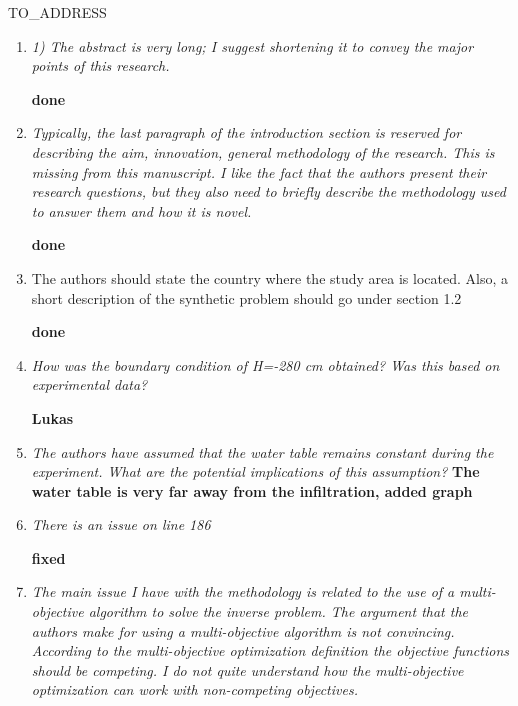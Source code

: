 \documentclass[a4paper,10pt]{letter}
\begin{document}

\begin{letter}{TO_ADDRESS}
\address{$$ADDRESS$$}





\signature{\\$$TITLE$$}



\begin{enumerate}
 \item {\it 1)	The abstract is very long; I suggest shortening it to convey the major points of this research.}
 
 {\bf done}
 \item {\it Typically, the last paragraph of the introduction section is reserved for describing the aim, innovation, general methodology of the research. This is missing from this manuscript. I like the fact that the authors present their research questions, but they also need to briefly describe the methodology used to answer them and how it is novel. } 
 
 {\bf done}
 
 \item {The authors should state the country where the study area is located. Also, a short description of the synthetic problem should go under section 1.2} 
 
 {\bf done}
 
 \item {\it How was the boundary condition of H=-280 cm obtained? Was this based on experimental data?}
 
 {\bf Lukas }
 
 \item {\it The authors have assumed that the water table remains constant during the experiment. What are the potential implications of this assumption? }
 {\bf The water table is very far away from the infiltration, added graph}
 
 \item {\it There is an issue on line 186} 
 
 {\bf fixed}
 
 \item {\it The main issue I have with the methodology is related to the use of a multi-objective algorithm to solve the inverse problem. The argument that the authors make for using a multi-objective algorithm is not convincing. According to the multi-objective optimization definition the objective functions should be competing. I do not quite understand how the multi-objective optimization can work with non-competing objectives. }
 

\end{enumerate}
\end{letter}
\end{document}

